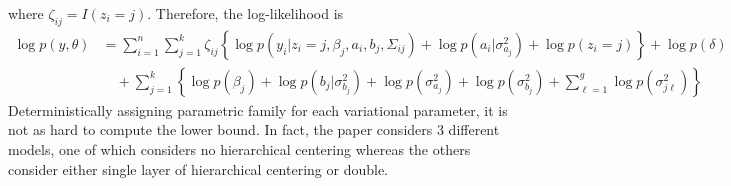 \documentclass[11pt]{article}
\begin{document}
where $\zeta_{ij} = I\left(z_{i}=j \right)$. Therefore, the log-likelihood is
\begin{align*}
  \log p(y, \theta) &= \sum_{i=1}^{n}\sum_{j=1}^{k} \zeta_{ij} \left\{\log p\left(y_{i}|z_{i}=j, \beta_{j}, a_{i}, b_{j}, \Sigma_{ij}\right) + \log p \left(a_{i}|\sigma_{a_{j}}^{2} \right)+\log p\left(z_{i}=j \right) \right\} + \log p \left(\delta \right) \\
  & \quad + \sum_{j=1}^{k} \left\{\log p \left(\beta_{j} \right) + \log p \left(b_{j}|\sigma_{b_{j}}^{2} \right) + \log p\left(\sigma_{a_{j}}^{2} \right)+ \log p\left(\sigma_{b_{j}}^{2} \right)+ \sum_{\ell=1}^{g} \log p \left(\sigma_{j\ell}^{2} \right) \right\}
\end{align*}
Deterministically assigning parametric family for each variational parameter, it is not as hard to compute the lower bound. In fact, the paper considers 3 different models, one of which considers no hierarchical centering whereas the others consider either single layer of hierarchical centering or double.
\end{document}
